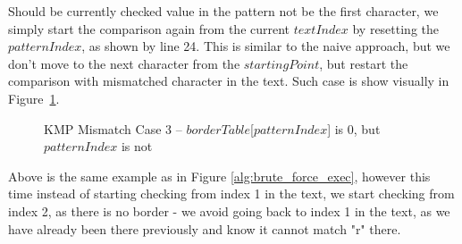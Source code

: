 Should be currently checked value in the pattern not be the first character, we simply start the comparison again from the current $textIndex$ by resetting the $patternIndex$, as shown by line 24. This is similar to the naive approach, but we don't move to the next character from the $startingPoint$, but restart the comparison with mismatched character in the text. Such case is show visually in Figure~\ref{kmp:mismatch-case-3}.


\begin{figure}[H]
    \centering
    \caption{KMP Mismatch Case 3 -- $borderTable$[$patternIndex$] is 0, but $patternIndex$ is not}
    \label{kmp:mismatch-case-3}
\end{figure}

Above is the same example as in Figure \ref{alg:brute_force_exec}, however this time instead of starting checking from index 1 in the text, we start checking from index 2, as there is no border - we avoid going back to index 1 in the text, as we have already been there previously and know it cannot match "r" there.



